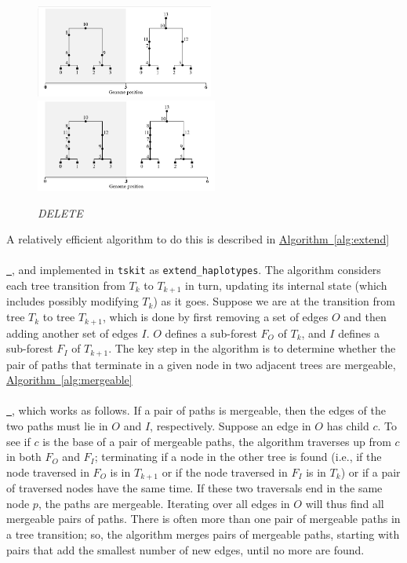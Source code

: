 \documentclass[10pt,twoside,lineno]{gsajnl}
\newcommand{\tskit}{\texttt{tskit}}
\newcommand{\comment}[1]{{\color{violet} \it #1}}
\newcommand{\algorithmref}[2][]{%
	\hyperref[{#2}]{%
		Algorithm~\ref*{#2}%
		\ifx\\#1\\%
		\else
		\,#1%
		\fi
	}%
}
\begin{document}
\begin{figure}[!ht]
	\begin{center}
		\includegraphics[width=0.4\linewidth, height=1.2in]{EH-Ex2.pdf}
		\includegraphics[width=0.4\linewidth, height=1.2in]{EH-extended-Ex2.pdf}
	\end{center}
	\caption{\comment{DELETE}}
	\label{fig:complicated_extending_diagram}
\end{figure}

A relatively efficient algorithm to do this is described in \algorithmref{alg:extend}, 
and implemented in \tskit{} as \texttt{extend\_haplotypes}.
The algorithm considers each tree transition from $T_k$ to $T_{k+1}$ in turn, updating its internal state
(which includes possibly modifying $T_k$) as it goes.
Suppose we are at the transition from tree $T_k$ to tree $T_{k+1}$,
which is done by first removing a set of edges $O$
and then adding another set of edges $I$.
$O$ defines a sub-forest $F_O$ of $T_k$,
and $I$ defines a sub-forest $F_I$ of $T_{k+1}$.
The key step in the algorithm is to determine whether the pair of paths
that terminate in a given node in two adjacent trees are mergeable,
\algorithmref{alg:mergeable}, which works as follows.
If a pair of paths is mergeable,
then the edges of the two paths must lie in $O$ and $I$, respectively.
Suppose an edge in $O$ has child $c$.
To see if $c$ is the base of a pair of mergeable paths,
the algorithm traverses up from $c$ in both $F_O$ and $F_I$;
terminating if a node in the other tree is found
(i.e., if the node traversed in $F_O$ is in $T_{k+1}$ or if the node traversed in $F_I$ is in $T_k$)
or if a pair of traversed nodes have the same time.
If these two traversals end in the same node $p$, the paths are mergeable.
Iterating over all edges in $O$ will thus find all mergeable pairs of paths.
There is often more than one pair of mergeable paths in a tree transition;
so, the algorithm merges pairs of mergeable paths,
starting with pairs that add the smallest number of new edges,
until no more are found.
\end{document}
